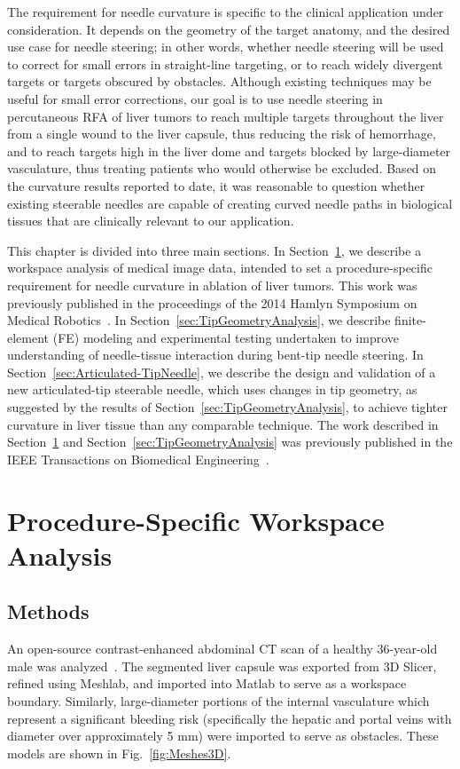 The requirement for needle curvature is specific to the clinical application under consideration. It depends on the geometry of the target anatomy, and the desired use case for needle steering; in other words, whether needle steering will be used to correct for small errors in straight-line targeting, or to reach widely divergent targets or targets obscured by obstacles. Although existing techniques may be useful for small error corrections, our goal is to use needle steering in percutaneous RFA of liver tumors to reach multiple targets throughout the liver from a single wound to the liver capsule, thus reducing the risk of hemorrhage, and to reach targets high in the liver dome and targets blocked by large-diameter vasculature, thus treating patients who would otherwise be excluded. Based on the curvature results reported to date, it was reasonable to question whether existing steerable needles are capable of creating curved needle paths in biological tissues that are clinically relevant to our application.

This chapter is divided into three main sections. In Section~\ref{sec:workspaceAnalysis}, we describe a workspace analysis of medical image data, intended to set a procedure-specific requirement for needle curvature in ablation of liver tumors. This work was previously published in the proceedings of the 2014 Hamlyn Symposium on Medical Robotics~\cite{Adebar2015}. In Section~\ref{sec:TipGeometryAnalysis}, we describe finite-element (FE) modeling and experimental testing undertaken to improve understanding of needle-tissue interaction during bent-tip needle steering. In Section~\ref{sec:Articulated-TipNeedle}, we describe the design and validation of a new articulated-tip steerable needle, which uses changes in tip geometry, as suggested by the results of Section~\ref{sec:TipGeometryAnalysis}, to achieve tighter curvature in liver tissue than any comparable technique. The work described in Section~\ref{sec:workspaceAnalysis} and  Section~\ref{sec:TipGeometryAnalysis} was previously published in the IEEE Transactions on Biomedical Engineering~\cite{Adebar2015a}.

\section{Procedure-Specific Workspace Analysis}
\label{sec:workspaceAnalysis}
\subsection{Methods}
An open-source contrast-enhanced abdominal CT scan of a healthy 36-year-old male was analyzed~\cite{Pieper2004}. The segmented liver capsule was exported from 3D Slicer, refined using Meshlab, and imported into Matlab to serve as a workspace boundary. Similarly, large-diameter portions of the internal vasculature which represent a significant bleeding risk (specifically the hepatic and portal veins with diameter over approximately 5 mm) were imported to serve as obstacles. These models are shown in Fig.~\ref{fig:Meshes3D}. 

